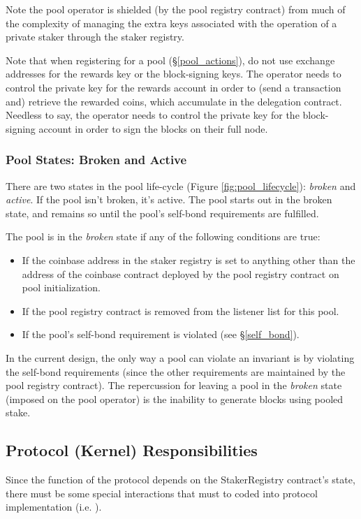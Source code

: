 Note the pool operator is shielded (by the pool registry contract) from much of the complexity of managing the extra keys associated with the operation of a private staker through the staker registry. 

Note that when registering for a pool (\S\ref{pool_actions}), do not use exchange addresses for the rewards key or the block-signing keys. The operator needs to control the private key for the rewards account in order to (send a transaction and) retrieve the rewarded coins, which accumulate in the delegation contract. Needless to say, the operator needs to control the private key for the block-signing account in order to sign the blocks on their full node.   

\subsubsection{Pool States: Broken and Active} \label{pool_states}

There are two states in the pool life-cycle (Figure \ref{fig:pool_lifecycle}): \textit{broken} and \textit{active}. If the pool isn't broken, it's active. The pool starts out in the broken state, and remains so until the pool's self-bond requirements are fulfilled. 

The pool is in the \textit{broken} state if any of the following conditions are true: 
\begin{itemize}
    \item If the coinbase address in the staker registry is set to anything other than the address of the coinbase contract deployed by the pool registry contract on pool initialization. 
    \item If the pool registry contract is removed from the listener list for this pool. 
    \item If the pool's self-bond requirement is violated (see \S\ref{self_bond}).
\end{itemize}

In the current design, the only way a pool can violate an invariant is by violating the self-bond requirements (since the other requirements are maintained by the pool registry contract). The repercussion for leaving a pool in the \textit{broken} state (imposed on the pool operator) is the inability to generate blocks using pooled stake.

\subsection{Protocol (Kernel) Responsibilities}
Since the function of the protocol depends on the StakerRegistry contract's state, there must be some special interactions that must to coded into protocol implementation (i.e. ). 

